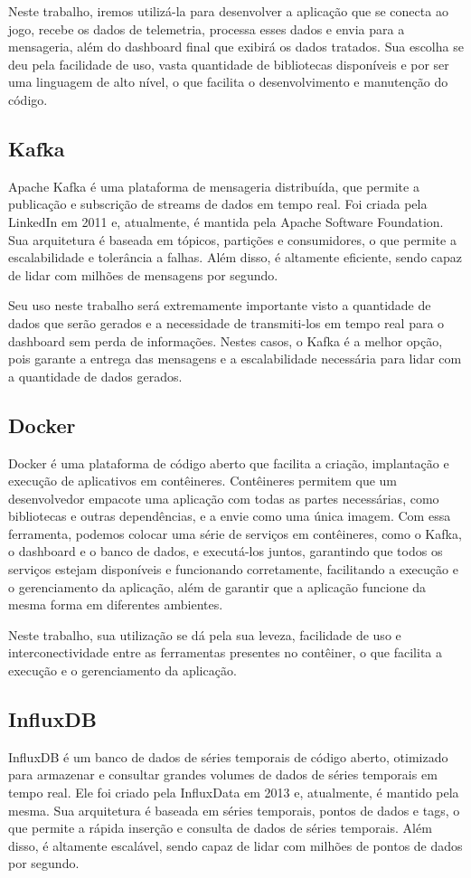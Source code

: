 \documentclass[12pt, %
openright, 
oneside, %
a4paper,    %
brazil]{facom-ufu-abntex2}
\begin{document}
Neste trabalho, iremos utilizá-la para desenvolver a aplicação que se conecta ao jogo, recebe os dados de telemetria, processa esses dados e envia para a mensageria, além do dashboard final que exibirá os dados tratados.
Sua escolha se deu pela facilidade de uso, vasta quantidade de bibliotecas disponíveis e por ser uma linguagem de alto nível, o que facilita o desenvolvimento e manutenção do código.

\subsection{Kafka}
Apache Kafka é uma plataforma de mensageria distribuída, que permite a publicação e subscrição de streams de dados em tempo real. Foi criada pela LinkedIn em 2011 e, atualmente, é mantida pela Apache Software Foundation.
Sua arquitetura é baseada em tópicos, partições e consumidores, o que permite a escalabilidade e tolerância a falhas. Além disso, é altamente eficiente, sendo capaz de lidar com milhões de mensagens por segundo.

Seu uso neste trabalho será extremamente importante visto a quantidade de dados que serão gerados e a necessidade de transmiti-los em tempo real para o dashboard sem perda de informações.
Nestes casos, o Kafka é a melhor opção, pois garante a entrega das mensagens e a escalabilidade necessária para lidar com a quantidade de dados gerados.

\subsection{Docker}
Docker é uma plataforma de código aberto que facilita a criação, implantação e execução de aplicativos em contêineres. Contêineres permitem que um desenvolvedor empacote uma aplicação com todas as partes necessárias, como bibliotecas e outras dependências, e a envie como uma única imagem.
Com essa ferramenta, podemos colocar uma série de serviços em contêineres, como o Kafka, o dashboard e o banco de dados, e executá-los juntos, garantindo que todos os serviços estejam disponíveis e funcionando corretamente, facilitando a execução e o gerenciamento da aplicação,
além de garantir que a aplicação funcione da mesma forma em diferentes ambientes.

Neste trabalho, sua utilização se dá pela sua leveza, facilidade de uso e interconectividade entre as ferramentas presentes no contêiner, o que facilita a execução e o gerenciamento da aplicação.

\subsection{InfluxDB}
InfluxDB é um banco de dados de séries temporais de código aberto, otimizado para armazenar e consultar grandes volumes de dados de séries temporais em tempo real. Ele foi criado pela InfluxData em 2013 e, atualmente, é mantido pela mesma.
Sua arquitetura é baseada em séries temporais, pontos de dados e tags, o que permite a rápida inserção e consulta de dados de séries temporais. Além disso, é altamente escalável, sendo capaz de lidar com milhões de pontos de dados por segundo.
\end{document}
